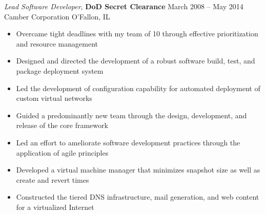 \documentclass[margin,line]{resume}
\begin{document}
\begin{resume}
{\sl Lead Software Developer}, \textbf{\small DoD Secret Clearance}   \hfill March 2008 -- May 2014\\
Camber Corporation                                                    \hfill O'Fallon, IL
\begin{itemize} \itemsep -2pt %
\small\item Overcame tight deadlines with my team of 10 through effective prioritization and resource management
\small\item Designed and directed the development of a robust software build, test, and package deployment system
\small\item Led the development of configuration capability for automated deployment of custom virtual networks
\small\item Guided a predominantly new team through the design, development, and release of the core framework
\small\item Led an effort to ameliorate software development practices through the application of agile principles
\small\item Developed a virtual machine manager that minimizes snapshot size as well as create and revert times
\small\item Constructed the tiered DNS infrastructure, mail generation, and web content for a virtualized Internet
\end{itemize}

% 


\end{resume}
\end{document}
